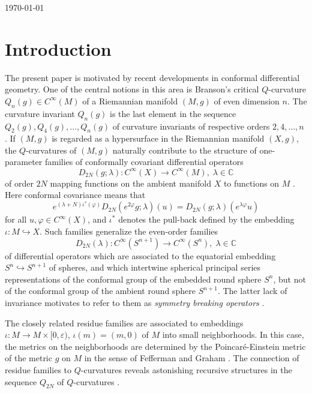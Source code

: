 \documentclass[a4paper,12pt,reqno]{amsart}
\numberwithin{theorem}{subsection}
\numberwithin{equation}{section}
\begin{document}
\maketitle

\centerline \today

\tableofcontents

\section{Introduction}\label{intro}

The present paper is motivated by recent developments in conformal differential
geometry. One of the central notions in this area is Branson's critical
$Q$-curvature $Q_n(g) \in C^\infty(M)$ of a Riemannian manifold $(M,g)$ of even
dimension $n$. The curvature invariant $Q_n(g)$ is the last element in the
sequence $Q_2(g), Q_4(g), \dots, Q_n(g)$ of curvature invariants of respective
orders $2,4,\dots,n$ \cite{Branson}. If $(M,g)$ is regarded as a hypersurface
in the Riemannian manifold $(X,g)$, the $Q$-curvatures of $(M,g)$ naturally
contribute to the structure of one-parameter families of conformally covariant
differential operators
\begin{equation}\label{curved-D}
   D_{2N}(g;\lambda): C^\infty(X) \to C^\infty(M), \; \lambda \in {\mathbb{C}}
\end{equation}
of order $2N$ mapping functions on the ambient manifold $X$ to functions on $M$
\cite{Juhl}. Here conformal covariance means that
$$
   e^{(\lambda+N)\iota^*(\varphi)} D_{2N}(e^{2\varphi}g;\lambda)(u) = D_{2N}(g;\lambda)
   \left(e^{\lambda \varphi} u\right)
$$
for all $u, \varphi \in C^\infty(X)$, and $\iota^*$ denotes the pull-back
defined by the embedding $\iota: M \hookrightarrow X$. Such families generalize
the even-order families
\begin{equation}\label{intertwine}
   D_{2N}(\lambda): C^\infty(S^{n+1}) \to C^\infty(S^n), \; \lambda \in {\mathbb{C}}
\end{equation}
of differential operators which are associated to the equatorial embedding $S^n
\hookrightarrow S^{n+1}$ of spheres, and which intertwine spherical principal
series representations of the conformal group of the embedded round sphere
$S^n$, but not of the conformal group of the ambient round sphere $S^{n+1}$.
The latter lack of invariance motivates to refer to them as {\it symmetry
breaking operators} \cite{kobayashi-speh, Kobayashi-Pevzner}.

The closely related residue families \cite{Juhl} are associated to embeddings
$\iota: M \to M \times [0,\varepsilon)$, $\iota(m) = (m,0)$ of $M$ into small
neighborhoods. In this case, the metrics on the neighborhoods are determined by
the Poincar\'e-Einstein metric of the metric $g$ on $M$ in the sense of
Fefferman and Graham \cite{FG3}. The connection of residue families to
$Q$-curvatures reveals astonishing recursive structures in the sequence
$Q_{2N}$ of $Q$-curvatures \cite{Juhl1}.
\end{document}
